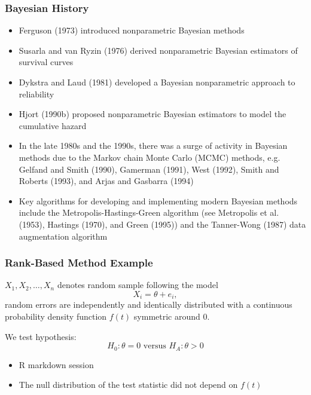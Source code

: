 \documentclass[10pt]{beamer}
\begin{document}
\begin{frame}
\frametitle{Bayesian History}

\begin{itemize}
\item Ferguson (1973) introduced nonparametric Bayesian methods
\item Susarla and van Ryzin (1976) derived nonparametric Bayesian estimators of survival curves
\item Dykstra and Laud (1981) developed a Bayesian nonparametric approach to reliability
\item Hjort (1990b) proposed nonparametric Bayesian estimators to model the cumulative hazard
\item In the late 1980s and the 1990s, there was a surge of activity in Bayesian methods due to the Markov chain Monte Carlo (MCMC) methods, e.g. Gelfand and Smith (1990), Gamerman (1991), West (1992), Smith and Roberts (1993), and Arjas and Gasbarra (1994)
\item Key algorithms for developing and implementing modern Bayesian methods include the Metropolis-Hastings-Green algorithm (see Metropolis et al. (1953), Hastings (1970), and Green (1995)) and the Tanner-Wong (1987) data augmentation algorithm
\end{itemize}

\end{frame}

\begin{frame}
\frametitle{Rank-Based Method Example}

$X_1,X_2,\dots,X_n$ denotes random sample following the model
\[ X_i = \theta + e_i, \]
random errors are independently and identically distributed with a continuous probability density function $f(t)$ symmetric around $0$.

We test hypothesis:
\[ H_0: \theta = 0 \text{ versus } H_A: \theta > 0 \]

\begin{itemize}
\item R markdown session
\item The null distribution of the test statistic did not depend on $f(t)$
\end{itemize}

\end{frame}
\end{document}

